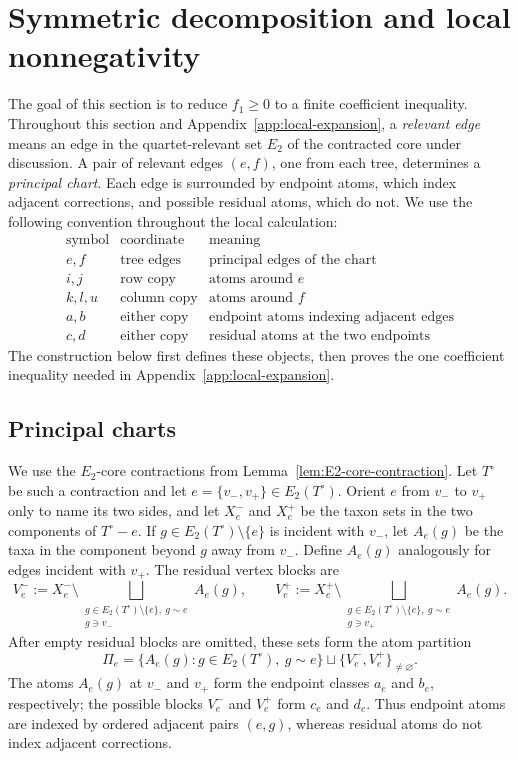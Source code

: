 \documentclass[11pt]{article}
\begin{document}
\section{Symmetric decomposition and local nonnegativity}

The goal of this section is to reduce $f_1\ge0$ to a finite coefficient
inequality.  Throughout this section and
Appendix~\ref{app:local-expansion}, a \emph{relevant edge} means an edge in
the quartet-relevant set $E_2$ of the contracted core under discussion.  A
pair of relevant edges $(e,f)$, one from each tree, determines a
\emph{principal chart}.  Each edge is surrounded by endpoint atoms, which
index adjacent corrections, and possible residual atoms, which do not.  We
use the following convention throughout the local calculation:
\[
\begin{array}{c|c|c}
\text{symbol}&\text{coordinate}&\text{meaning}\\
\hline
e,f&\text{tree edges}&\text{principal edges of the chart}\\
i,j&\text{row copy}&\text{atoms around }e\\
k,l,u&\text{column copy}&\text{atoms around }f\\
a,b&\text{either copy}&\text{endpoint atoms indexing adjacent edges}\\
c,d&\text{either copy}&\text{residual atoms at the two endpoints}
\end{array}
\]
The construction below first defines these objects, then proves the one
coefficient inequality needed in Appendix~\ref{app:local-expansion}.

\subsection{Principal charts}\label{subsec:principal-charts}

We use the $E_2$-core contractions from
Lemma~\ref{lem:E2-core-contraction}.  Let $T^\circ$ be such a contraction and
let $e=\{v_-,v_+\}\in E_2(T^\circ)$.  Orient $e$ from $v_-$ to $v_+$ only to
name its two sides, and let $X_e^-$ and $X_e^+$ be the taxon sets in the two
components of $T^\circ-e$.  If
$g\in E_2(T^\circ)\setminus\{e\}$ is incident with $v_-$, let $A_e(g)$ be the
taxa in the component beyond $g$ away from $v_-$.  Define $A_e(g)$
analogously for edges incident with $v_+$.  The residual vertex blocks are
\[
 V_e^-:=X_e^-\setminus\bigsqcup_{\substack{
 g\in E_2(T^\circ)\setminus\{e\},\ g\sim e\\g\ni v_-}}A_e(g),
 \qquad
 V_e^+:=X_e^+\setminus\bigsqcup_{\substack{
 g\in E_2(T^\circ)\setminus\{e\},\ g\sim e\\g\ni v_+}}A_e(g).
\]
After empty residual blocks are omitted, these sets form the atom partition
\[
 \Pi_e=
 \{A_e(g):g\in E_2(T^\circ),\ g\sim e\}
 \sqcup\{V_e^-,V_e^+\}_{\ne\varnothing}.
\]
The atoms $A_e(g)$ at $v_-$ and $v_+$ form the endpoint classes $a_e$ and
$b_e$, respectively; the possible blocks $V_e^-$ and $V_e^+$ form $c_e$ and
$d_e$.  Thus endpoint atoms are indexed by ordered adjacent pairs $(e,g)$,
whereas residual atoms do not index adjacent corrections.
\end{document}
